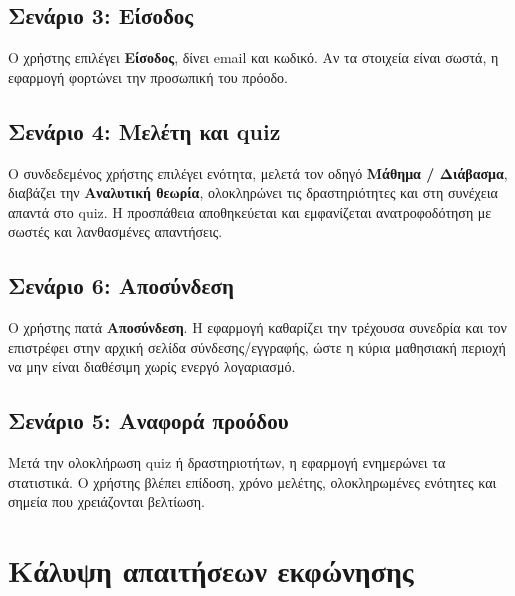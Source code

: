 \documentclass[12pt,a4paper]{article}
\begin{document}
\subsection{Σενάριο 3: Είσοδος}

Ο χρήστης επιλέγει \textbf{Είσοδος}, δίνει email και κωδικό. Αν τα στοιχεία είναι σωστά, η εφαρμογή φορτώνει την προσωπική του πρόοδο.

\subsection{Σενάριο 4: Μελέτη και quiz}

Ο συνδεδεμένος χρήστης επιλέγει ενότητα, μελετά τον οδηγό \textbf{Μάθημα / Διάβασμα}, διαβάζει την \textbf{Αναλυτική θεωρία}, ολοκληρώνει τις δραστηριότητες και στη συνέχεια απαντά στο quiz. Η προσπάθεια αποθηκεύεται και εμφανίζεται ανατροφοδότηση με σωστές και λανθασμένες απαντήσεις.

\subsection{Σενάριο 6: Αποσύνδεση}

Ο χρήστης πατά \textbf{Αποσύνδεση}. Η εφαρμογή καθαρίζει την τρέχουσα συνεδρία και τον επιστρέφει στην αρχική σελίδα σύνδεσης/εγγραφής, ώστε η κύρια μαθησιακή περιοχή να μην είναι διαθέσιμη χωρίς ενεργό λογαριασμό.

\subsection{Σενάριο 5: Αναφορά προόδου}

Μετά την ολοκλήρωση quiz ή δραστηριοτήτων, η εφαρμογή ενημερώνει τα στατιστικά. Ο χρήστης βλέπει επίδοση, χρόνο μελέτης, ολοκληρωμένες ενότητες και σημεία που χρειάζονται βελτίωση.

\section{Κάλυψη απαιτήσεων εκφώνησης}
\end{document}
